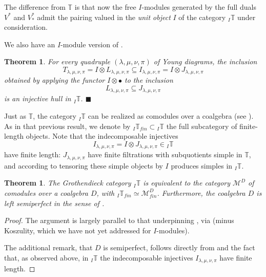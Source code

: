 \documentclass[11pt]{article}
\theoremstyle{plain}
\newtheorem{theorem}[lemma]{Theorem}
\theoremstyle{nonumberplain}
\theoremstyle{plain}
\numberwithin{equation}{section}
\theoremstyle{nonumberplain}
\newtheorem{proof}{Proof}
\newcommand\bT{{\mathbb T}}
\newcommand\cM{{\mathcal M}}
\newcommand\1{{\bf 1}}
\newcommand{\qedhere}{\mbox{}\hfill\ensuremath{\blacksquare}}
\begin{document}
The difference from $\bT$ is that now the free $I$-modules generated by the full duals $V^*$ and $V_*^*$ admit the pairing  valued in the {\it unit object} $I$ of the category ${}_I\bT$ under consideration. 


We also have an $I$-module version of . 

\begin{theorem}\label{thm:ihulls}
    For every quadruple $(\lambda,\mu,\nu,\pi)$ of Young diagrams, the inclusion
  \begin{equation*}
    T_{\lambda,\mu,\nu,\pi} = I\otimes L_{\lambda,\mu,\nu,\pi} \subseteq I_{\lambda,\mu,\nu,\pi} = I\otimes J_{\lambda,\mu,\nu,\pi}
  \end{equation*}
  obtained by applying the functor $I\otimes \bullet$ to the inclusion
  \begin{equation*}
    L_{\lambda,\mu,\nu,\pi} \subseteq J_{\lambda,\mu,\nu,\pi}
  \end{equation*}
  is an injective hull in ${}_I\bT$.
  \qedhere
\end{theorem}


Just as $\bT$, the category ${}_I\bT$ can be realized as comodules over a coalgebra (see ). As in that previous result, we denote by ${}_I\bT_{fin}\subset {}_I\bT$ the full subcategory of finite-length objects. Note that the indecomposable injectives
\begin{equation*}
I_{\lambda,\mu,\nu,\pi} = I\otimes J_{\lambda,\mu,\nu,\pi}  \in {}_I\bT
\end{equation*}
have finite length: $J_{\lambda,\mu,\nu,\pi}$ have finite filtrations with subquotients simple in $\bT$, and according to  tensoring these simple objects by $I$ produces simples in ${}_I\bT$.

\begin{theorem}\label{th:ikoszcoalg}
  The Grothendieck category ${}_I{\bT}$ is equivalent to the category $\cM^D$ of comodules over a coalgebra $D$, with ${}_I\bT_{fin}\simeq \cM^D_{fin}$. Furthermore, the coalgebra $D$ is left semiperfect in the sense of . 
\end{theorem}
\begin{proof}
  The argument is largely parallel to that underpinning , via  (minus Koszulity, which we have not yet addressed for $I$-modules).

  The additional remark, that $D$ is semiperfect, follows directly from  and the fact that, as observed above, in ${}_I\bT$ the indecomposable injectives $I_{\lambda,\mu,\nu,\pi}$ have finite length.
\end{proof}
\end{document}
